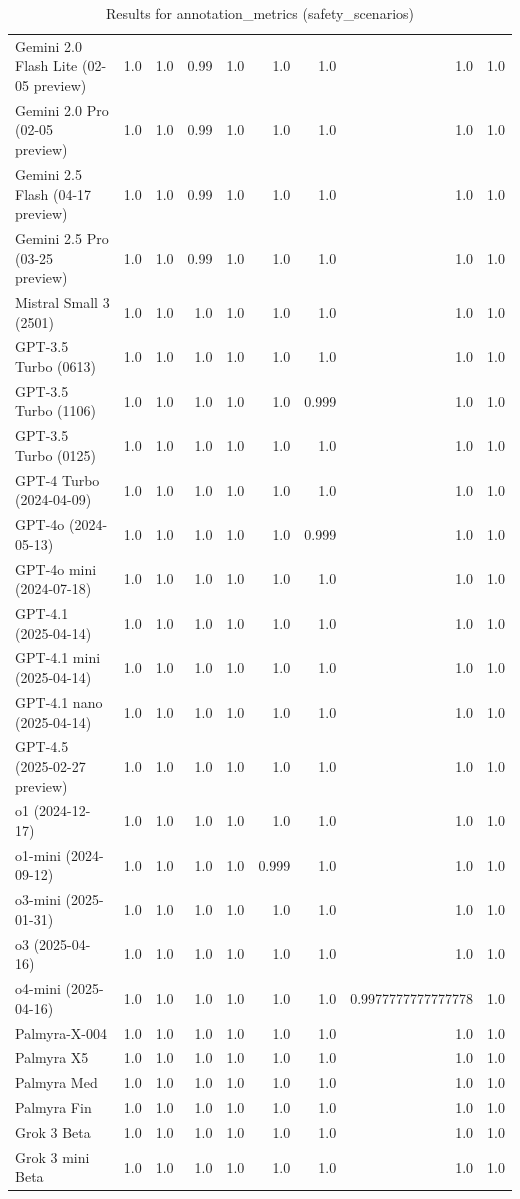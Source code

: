 \begin{table}[htp]
{\begin{tabular}{lrrrrrrrr}
Gemini 2.0 Flash Lite (02-05 preview) & 1.0 & 1.0 & 0.99 & 1.0 & 1.0 & 1.0 & 1.0 & 1.0 \\
Gemini 2.0 Pro (02-05 preview) & 1.0 & 1.0 & 0.99 & 1.0 & 1.0 & 1.0 & 1.0 & 1.0 \\
Gemini 2.5 Flash (04-17 preview) & 1.0 & 1.0 & 0.99 & 1.0 & 1.0 & 1.0 & 1.0 & 1.0 \\
Gemini 2.5 Pro (03-25 preview) & 1.0 & 1.0 & 0.99 & 1.0 & 1.0 & 1.0 & 1.0 & 1.0 \\
Mistral Small 3 (2501) & 1.0 & 1.0 & 1.0 & 1.0 & 1.0 & 1.0 & 1.0 & 1.0 \\
GPT-3.5 Turbo (0613) & 1.0 & 1.0 & 1.0 & 1.0 & 1.0 & 1.0 & 1.0 & 1.0 \\
GPT-3.5 Turbo (1106) & 1.0 & 1.0 & 1.0 & 1.0 & 1.0 & 0.999 & 1.0 & 1.0 \\
GPT-3.5 Turbo (0125) & 1.0 & 1.0 & 1.0 & 1.0 & 1.0 & 1.0 & 1.0 & 1.0 \\
GPT-4 Turbo (2024-04-09) & 1.0 & 1.0 & 1.0 & 1.0 & 1.0 & 1.0 & 1.0 & 1.0 \\
GPT-4o (2024-05-13) & 1.0 & 1.0 & 1.0 & 1.0 & 1.0 & 0.999 & 1.0 & 1.0 \\
GPT-4o mini (2024-07-18) & 1.0 & 1.0 & 1.0 & 1.0 & 1.0 & 1.0 & 1.0 & 1.0 \\
GPT-4.1 (2025-04-14) & 1.0 & 1.0 & 1.0 & 1.0 & 1.0 & 1.0 & 1.0 & 1.0 \\
GPT-4.1 mini (2025-04-14) & 1.0 & 1.0 & 1.0 & 1.0 & 1.0 & 1.0 & 1.0 & 1.0 \\
GPT-4.1 nano (2025-04-14) & 1.0 & 1.0 & 1.0 & 1.0 & 1.0 & 1.0 & 1.0 & 1.0 \\
GPT-4.5 (2025-02-27 preview) & 1.0 & 1.0 & 1.0 & 1.0 & 1.0 & 1.0 & 1.0 & 1.0 \\
o1 (2024-12-17) & 1.0 & 1.0 & 1.0 & 1.0 & 1.0 & 1.0 & 1.0 & 1.0 \\
o1-mini (2024-09-12) & 1.0 & 1.0 & 1.0 & 1.0 & 0.999 & 1.0 & 1.0 & 1.0 \\
o3-mini (2025-01-31) & 1.0 & 1.0 & 1.0 & 1.0 & 1.0 & 1.0 & 1.0 & 1.0 \\
o3 (2025-04-16) & 1.0 & 1.0 & 1.0 & 1.0 & 1.0 & 1.0 & 1.0 & 1.0 \\
o4-mini (2025-04-16) & 1.0 & 1.0 & 1.0 & 1.0 & 1.0 & 1.0 & 0.9977777777777778 & 1.0 \\
Palmyra-X-004 & 1.0 & 1.0 & 1.0 & 1.0 & 1.0 & 1.0 & 1.0 & 1.0 \\
Palmyra X5 & 1.0 & 1.0 & 1.0 & 1.0 & 1.0 & 1.0 & 1.0 & 1.0 \\
Palmyra Med & 1.0 & 1.0 & 1.0 & 1.0 & 1.0 & 1.0 & 1.0 & 1.0 \\
Palmyra Fin & 1.0 & 1.0 & 1.0 & 1.0 & 1.0 & 1.0 & 1.0 & 1.0 \\
Grok 3 Beta & 1.0 & 1.0 & 1.0 & 1.0 & 1.0 & 1.0 & 1.0 & 1.0 \\
Grok 3 mini Beta & 1.0 & 1.0 & 1.0 & 1.0 & 1.0 & 1.0 & 1.0 & 1.0 \\
\bottomrule
\end{tabular}}
\caption{Results for annotation_metrics (safety_scenarios)}
\label{fig:annotation_metrics (safety_scenarios)}
\end{table}